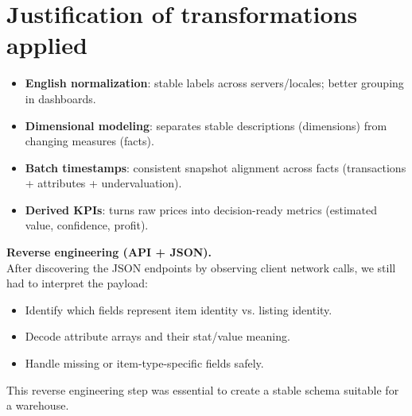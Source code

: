 \section{Justification of transformations applied}
\begin{itemize}
  \item \textbf{English normalization}: stable labels across servers/locales; better grouping in dashboards.
  \item \textbf{Dimensional modeling}: separates stable descriptions (dimensions) from changing measures (facts).
  \item \textbf{Batch timestamps}: consistent snapshot alignment across facts (transactions + attributes + undervaluation).
  \item \textbf{Derived KPIs}: turns raw prices into decision-ready metrics (estimated value, confidence, profit).
\end{itemize}

\begin{challengebox}
\textbf{Reverse engineering (API + JSON).} \\[0.25em]
After discovering the JSON endpoints by observing client network calls, we still had to interpret the payload:
\begin{itemize}
  \item Identify which fields represent item identity vs. listing identity.
  \item Decode attribute arrays and their stat/value meaning.
  \item Handle missing or item-type-specific fields safely.
\end{itemize}
This reverse engineering step was essential to create a stable schema suitable for a warehouse.
\end{challengebox}

